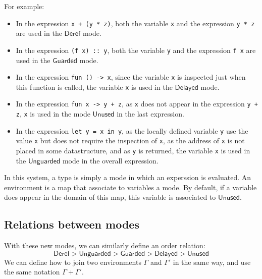 \documentclass{article}
\newcommand{\Deref}{\mathsf{Deref}}
\newcommand{\Unguarded}{\mathsf{Unguarded}}
\newcommand{\Guarded}{\mathsf{Guarded}}
\newcommand{\Delayed}{\mathsf{Delayed}}
\newcommand{\Unused}{\mathsf{Unused}}
\begin{document}
For example:
\begin{itemize}
  \item In the expression \lstinline|x + (y * z)|, both the variable
    \lstinline|x| and the expression \lstinline|y * z| are used in the $\Deref$
    mode.
  \item In the expression \lstinline|(f x) :: y|, both the variable
    \lstinline|y| and the expression \lstinline|f x| are used in the $\Guarded$
    mode.
  \item In the expression \lstinline|fun () -> x|, since the variable
    \lstinline|x| is inspected just when this function is called, the variable
    \lstinline|x| is used in the $\Delayed$ mode.
  \item In the expression \lstinline|fun x -> y + z|, as \lstinline|x| does not
    appear in the expression \lstinline|y + z|, \lstinline|x| is used in the
    mode $\Unused$ in the last expression.
  \item In the expression \lstinline|let y = x in y|, as the locally defined
    variable \lstinline|y| use the value \lstinline|x| but does not require the
    inspection of \lstinline|x|, as the address of \lstinline|x| is not placed
    in some datastructure, and as \lstinline|y| is returned, the variable
    \lstinline|x| is used in the $\Unguarded$ mode in the overall expression.

\end{itemize}

In this system, a type is simply a mode in which an experssion is evaluated. An
environment is a map that associate to variables a mode. By default, if a
variable does appear in the domain of this map, this variable is associated to
$\Unused$.

\subsection{Relations between modes}
With these new modes, we can similarly define an order relation:
$$\Deref > \Unguarded > \Guarded > \Delayed > \Unused$$
We can define how to join two environments $\Gamma$ and $\Gamma'$ in the same
way, and use the same notation $\Gamma + \Gamma'$.
\end{document}
